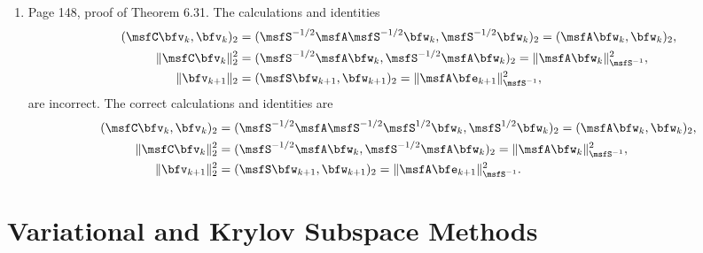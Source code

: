 \documentclass{book}
\begin{document}
\begin{enumerate}
	\item
Page 148, proof of Theorem 6.31.  The calculations and identities 
\begin{align*}
  (\msfC\bfv_k,\bfv_k)_2 &= (\msfS^{-1/2}\msfA\msfS^{-1/2}\bfw_k,\msfS^{-1/2}\bfw_k)_2 = (\msfA\bfw_k,\bfw_k)_2, \\ 
  \| \msfC\bfv_k \|_2^2 &= (\msfS^{-1/2}\msfA\bfw_k,\msfS^{-1/2}\msfA\bfw_k)_2 = \| \msfA\bfw_k \|_{\msfS^{-1}}^2, \\
  \| \bfv_{k+1} \|_2 & = (\msfS\bfw_{k+1},\bfw_{k+1} )_2 = \| \msfA\bfe_{k+1} \|_{\msfS^{-1}}^2,
\end{align*}
are incorrect. The correct calculations and identities are
	\begin{align*}
(\msfC\bfv_k,\bfv_k)_2 &= (\msfS^{-1/2}\msfA\msfS^{-1/2}\msfS^{1/2}\bfw_k,\msfS^{1/2}\bfw_k)_2 = (\msfA\bfw_k,\bfw_k)_2, 
	\\ 
  \| \msfC\bfv_k \|_2^2 &= (\msfS^{-1/2}\msfA\bfw_k,\msfS^{-1/2}\msfA\bfw_k)_2 = \| \msfA\bfw_k \|_{\msfS^{-1}}^2, \\
  \| \bfv_{k+1} \|_2^2 & = (\msfS\bfw_{k+1},\bfw_{k+1} )_2 = \| \msfA\bfe_{k+1} \|_{\msfS^{-1}}^2.
\end{align*}


	\end{enumerate}
	
	\chapter{Variational and Krylov Subspace Methods}
	
\end{document}
